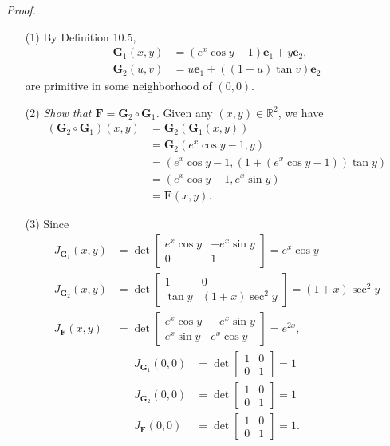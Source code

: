 \documentclass{article}
\begin{document}
\emph{Proof.}
\begin{enumerate}
\item[(1)]
  By Definition 10.5,
  \begin{align*}
    \mathbf{G}_1(x,y) &= (e^x \cos y - 1) \mathbf{e}_1 + y \mathbf{e}_2, \\
    \mathbf{G}_2(u,v) &= u \mathbf{e}_1 + ((1+u) \tan v) \mathbf{e}_2
  \end{align*}
  are primitive in some neighborhood of $(0,0)$.

\item[(2)]
  \emph{Show that $\mathbf{F} = \mathbf{G}_2 \circ \mathbf{G}_1$.}
  Given any $(x,y) \in \mathbb{R}^2$, we have
  \begin{align*}
    (\mathbf{G}_2 \circ \mathbf{G}_1)(x,y)
    &= \mathbf{G}_2(\mathbf{G}_1(x,y)) \\
    &= \mathbf{G}_2(e^x \cos y - 1, y) \\
    &= (e^x \cos y - 1, (1+(e^x \cos y - 1)) \tan y) \\
    &= (e^x \cos y - 1, e^x \sin y) \\
    &= \mathbf{F}(x,y).
  \end{align*}

\item[(3)]
  Since
  \begin{align*}
    J_{\mathbf{G}_1}(x,y)
    &=
    \det\begin{bmatrix}
      e^x \cos y & -e^x \sin y \\
      0 & 1
    \end{bmatrix}
    = e^x \cos y \\
    J_{\mathbf{G}_2}(x,y)
    &=
    \det\begin{bmatrix}
      1 & 0 \\
      \tan y & (1+x)\sec^2 y
    \end{bmatrix}
    = (1+x)\sec^2 y \\
    J_{\mathbf{F}}(x,y)
    &=
    \det\begin{bmatrix}
      e^x \cos y & -e^x \sin y \\
      e^x \sin y & e^x \cos y
    \end{bmatrix}
    = e^{2x},
  \end{align*}
  \begin{align*}
    J_{\mathbf{G}_1}(0,0)
    &=
    \det\begin{bmatrix}
      1 & 0 \\
      0 & 1
    \end{bmatrix}
    = 1 \\
    J_{\mathbf{G}_2}(0,0)
    &=
    \det\begin{bmatrix}
      1 & 0 \\
      0 & 1
    \end{bmatrix}
    = 1 \\
    J_{\mathbf{F}}(0,0)
    &=
    \det\begin{bmatrix}
      1 & 0 \\
      0 & 1
    \end{bmatrix}
    = 1.
  \end{align*}


\end{enumerate}
\end{document}
